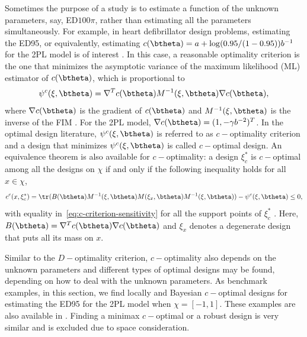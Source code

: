   Sometimes the purpose of a study is to estimate a function of the unknown parameters, say, ED$100\pi$, rather than estimating all the parameters simultaneously.
For example, in heart defibrillator design problems, estimating   the ED95, or equivalently, estimating  $c(\btheta) = a + \log(0.95/(1-0.95)) b^{-1}$ for the 2PL model  is of interest  \citep{clyde1995optimal}.
In this case, a reasonable optimality criterion is the one that minimizes   the asymptotic variance of the maximum likelihood (ML) estimator  of $c(\btheta)$, which is proportional to
\begin{equation}
\label{eq:c-criterion}
\psi^c(\xi, \btheta) = \nabla^T c(\btheta)M^{-1}(\xi, \btheta)\nabla c(\btheta),
\end{equation}
where $\nabla c(\btheta)$ is the gradient of $c(\btheta)$ and $M^{-1}(\xi, \btheta)$ is the inverse of the FIM \citep[see, e.g., ][page 4]{silvey1980}.  For the 2PL model, $\nabla c(\btheta) = (1, -\gamma b^{-2})^T$.
In the optimal design literature, $\psi^c(\xi, \btheta)$ is referred to as  $c-$optimality criterion and a design that minimizes $\psi^c(\xi, \btheta)$  is called $c-$optimal design.
An equivalence theorem is also available for $c-$optimality: a design  $\xi^*_{c}$  is $c-$optimal among all  the designs on $\chi$ if and only if the following inequality holds for all $x \in \chi$,
\begin{equation}
\label{eq:c-criterion-sensitivity}
c^c(x, \xi^*_{c}) = \tr(B(\btheta) M^{-1}(\xi, \btheta)M(\xi_x, \btheta)M^{-1}(\xi, \btheta)) - \psi^c(\xi, \btheta) \leq 0,
\end{equation}
with equality in~\eqref{eq:c-criterion-sensitivity} for all the support points of $\xi^*_{c}$ \citep[see, e.g.,][]{chaloner1989}. Here, $B(\btheta) = \nabla^T c(\btheta)\nabla c(\btheta)$ and $\xi_x$ denotes a degenerate design that puts all its mass on $x$.

Similar to the $D-$optimality criterion, $c-$optimality also depends on the unknown parameters and different types of optimal designs may be found, depending on how to deal with the unknown parameters.
As benchmark examples,  in this section, we  find locally and Bayesian $c-$optimal designs for estimating  the ED95 for the 2PL model  when $\chi = [-1, 1]$.
These examples are also available in   \citet{chaloner1989}.
Finding a minimax $c-$optimal or a robust design is very similar and is excluded due to space consideration.

  
